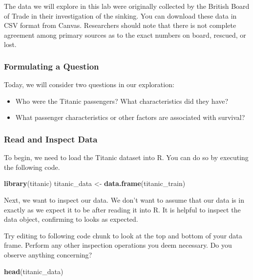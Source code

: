 \documentclass[
]{article}
\newenvironment{Shaded}{\begin{snugshade}}{\end{snugshade}}
\newcommand{\KeywordTok}[1]{\textcolor[rgb]{0.13,0.29,0.53}{\textbf{#1}}}
\newcommand{\NormalTok}[1]{#1}
\newcommand{\StringTok}[1]{\textcolor[rgb]{0.31,0.60,0.02}{#1}}
\providecommand{\tightlist}{%
  \setlength{\itemsep}{0pt}\setlength{\parskip}{0pt}}
\begin{document}
The data we will explore in this lab were originally collected by the
British Board of Trade in their investigation of the sinking. You can
download these data in CSV format from Canvas. Researchers should note
that there is not complete agreement among primary sources as to the
exact numbers on board, rescued, or lost.

\hypertarget{formulating-a-question}{%
\subsubsection{Formulating a Question}\label{formulating-a-question}}

Today, we will consider two questions in our exploration:

\begin{itemize}
\tightlist
\item
  Who were the Titanic passengers? What characteristics did they have?
\item
  What passenger characteristics or other factors are associated with
  survival?
\end{itemize}

\hypertarget{read-and-inspect-data}{%
\subsubsection{Read and Inspect Data}\label{read-and-inspect-data}}

To begin, we need to load the Titanic dataset into R. You can do so by
executing the following code.

\begin{Shaded}
\begin{Highlighting}[]
\KeywordTok{library}\NormalTok{(titanic)}
\NormalTok{titanic_data <-}\StringTok{ }\KeywordTok{data.frame}\NormalTok{(titanic_train)}
\end{Highlighting}
\end{Shaded}

Next, we want to inspect our data. We don't want to assume that our data
is in exactly as we expect it to be after reading it into R. It is
helpful to inspect the data object, confirming to looks as expected.

Try editing to following code chunk to look at the top and bottom of
your data frame. Perform any other inspection operations you deem
necessary. Do you observe anything concerning?

\begin{Shaded}
\begin{Highlighting}[]
\KeywordTok{head}\NormalTok{(titanic_data)}
\end{Highlighting}
\end{Shaded}
\end{document}

